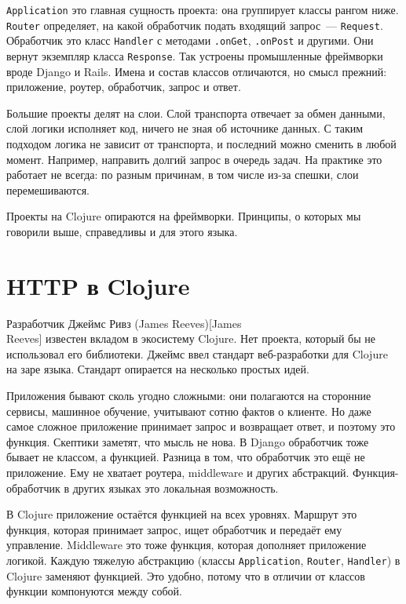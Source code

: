 \verb|Application| это главная сущность проекта: она группирует классы рангом
ниже. \verb|Router| определяет, на какой обработчик подать входящий запрос~---
\verb|Request|. Обработчик это класс \verb|Handler| с методами
\verb|.onGet|, \verb|.onPost| и другими. Они вернут экземпляр класса
\verb|Response|. Так устроены промышленные фреймворки вроде Django и
Rails. Имена и состав классов отличаются, но смысл прежний: приложение, роутер,
обработчик, запрос и ответ.


Большие проекты делят на слои. Слой транспорта отвечает за обмен данными, слой
логики исполняет код, ничего не зная об источнике данных. С таким подходом
логика не зависит от транспорта, и последний можно сменить в любой
момент. Например, направить долгий запрос в очередь задач. На практике это
работает не всегда: по разным причинам, в том числе из-за спешки, слои
перемешиваются.

Проекты на Clojure опираются на фреймворки. Принципы, о которых мы говорили
выше, справедливы и для этого языка.

\section{HTTP в Clojure}


Разработчик Джеймс Ривз (James Reeves)[James\\Reeves]
известен вкладом в экосистему Clojure. Нет проекта, который бы не использовал
его библиотеки. Джеймс ввел стандарт веб-разработки для Clojure на заре
языка. Стандарт опирается на несколько простых идей.

Приложения бывают сколь угодно сложными: они полагаются на сторонние сервисы,
машинное обучение, учитывают сотню фактов о клиенте. Но даже самое сложное
приложение принимает запрос и возвращает ответ, и поэтому это функция. Скептики
заметят, что мысль не нова. В Django обработчик тоже бывает не классом, а
функцией. Разница в том, что обработчик это ещё не приложение. Ему не
хватает роутера, middleware и других абстракций. Функция-обработчик в других
языках это локальная возможность.

\label{http-all-function}

В Clojure приложение остаётся функцией на всех уровнях. Маршрут это функция,
которая принимает запрос, ищет обработчик и передаёт ему управление. Middleware
это тоже функция, которая дополняет приложение логикой. Каждую тяжелую
абстракцию (классы \verb|Application|, \verb|Router|, \verb|Handler|) в
Clojure заменяют функцией. Это удобно, потому что в отличии от классов функции
компонуются между собой.

